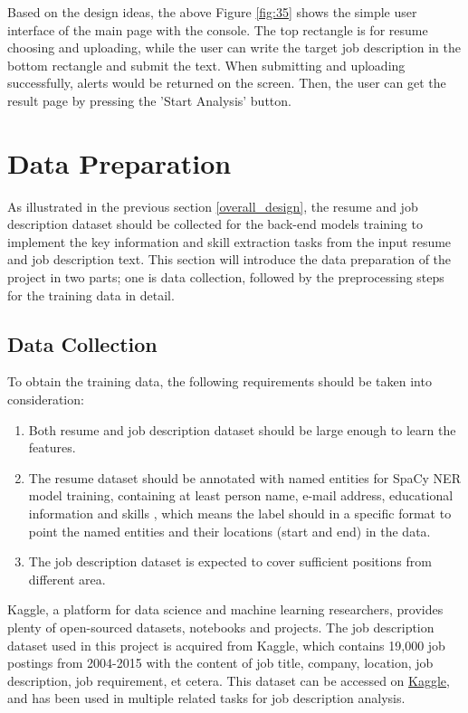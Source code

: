 Based on the design ideas, the above Figure \ref{fig:35} shows the simple user interface of the main page with the console. The top rectangle is for resume choosing and uploading, while the user can write the target job description in the bottom rectangle and submit the text. When submitting and uploading successfully, alerts would be returned on the screen. Then, the user can get the result page by pressing the 'Start Analysis' button.


\section{Data Preparation}

As illustrated in the previous section \ref{overall_design}, the resume and job description dataset should be collected for the back-end models training to implement the key information and skill extraction tasks from the input resume and job description text. This section will introduce the data preparation of the project in two parts; one is data collection, followed by the preprocessing steps for the training data in detail.

\subsection{Data Collection}
\label{sec:data}

To obtain the training data, the following requirements should be taken into consideration:

\begin{enumerate}
    \item Both resume and job description dataset should be large enough to learn the features.
    \item The resume dataset should be annotated with named entities for SpaCy NER model training, containing at least person name, e-mail address, educational information and skills , which means the label should in a specific format to point the named entities and their locations (start and end) in the data.
    \item The job description dataset is expected to cover sufficient positions from different area.
\end{enumerate}

Kaggle, a platform for data science and machine learning researchers, provides plenty of open-sourced datasets, notebooks and projects. The job description dataset used in this project is acquired from Kaggle, which contains 19,000 job postings from 2004-2015 with the content of job title, company, location, job description, job requirement, et cetera. This dataset can be accessed on \href{https://www.kaggle.com/datasets/madhab/jobposts?datasetId=1150}{Kaggle}, and has been used in multiple related tasks for job description analysis.

